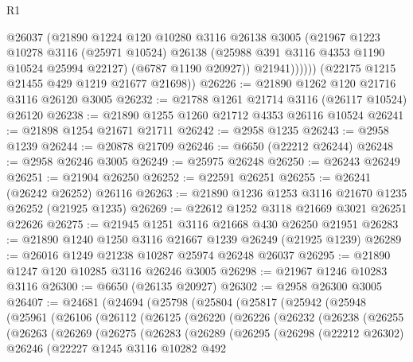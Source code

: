 \begin{lexlean}{R1}
\begin{coremodule}
                @26037
                (@21890
                  @1224
                  @120
                  @10280
                  @3116
                  @26138
                  @3005
                  (@21967
                    @1223
                    @10278
                    @3116
                    (@25971 @10524)
                    @26138
                    (@25988 @391 @3116 @4353 @1190 @10524 @25994 @22127)
                    (@6787 @1190 @20927))
                  @21941))))))
      (@22175 @1215 @21455 @429 @1219 @21677 @21698))
@26226 := @21890 @1262 @120 @21716 @3116 @26120 @3005
@26232 := @21788 @1261 @21714 @3116 (@26117 @10524) @26120
@26238 := @21890 @1255 @1260 @21712 @4353 @26116 @10524
@26241 := @21898 @1254 @21671 @21711
@26242 := @2958 @1235
@26243 := @2958 @1239
@26244 := @20878 @21709
@26246 := @6650 (@22212 @26244)
@26248 := @2958 @26246 @3005
@26249 := @25975 @26248
@26250 := @26243 @26249
@26251 := @21904 @26250
@26252 := @22591 @26251
@26255 := @26241 (@26242 @26252) @26116
@26263 := @21890 @1236 @1253 @3116 @21670 @1235 @26252 (@21925 @1235)
@26269 := @22612 @1252 @3118 @21669 @3021 @26251 @22626
@26275 := @21945 @1251 @3116 @21668 @430 @26250 @21951
@26283 := @21890 @1240 @1250 @3116 @21667 @1239 @26249 (@21925 @1239)
@26289 := @26016 @1249 @21238 @10287 @25974 @26248 @26037
@26295 := @21890 @1247 @120 @10285 @3116 @26246 @3005
@26298 := @21967 @1246 @10283 @3116
@26300 := @6650 (@26135 @20927)
@26302 := @2958 @26300 @3005
@26407 := @24681
    (@24694
      (@25798
        (@25804
          (@25817
            (@25942
              (@25948
                (@25961
                  (@26106
                    (@26112
                      (@26125
                        (@26220
                          (@26226
                            (@26232
                              (@26238
                                (@26255
                                  (@26263
                                    (@26269
                                      (@26275
                                        (@26283
                                          (@26289
                                            (@26295
                                              (@26298
                                                (@22212 @26302)
                                                @26246
                                                (@22227
                                                  @1245
                                                  @3116
                                                  @10282
                                                  @492

\end{coremodule}
\end{lexlean}
